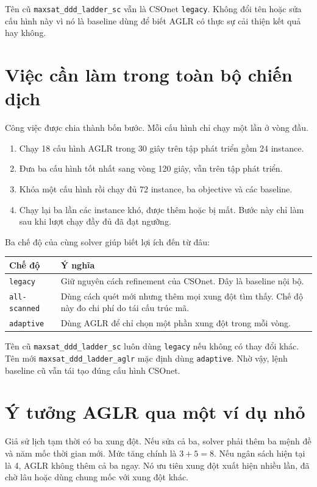 \documentclass[11pt,a4paper]{article}
\newcommand{\code}[1]{\texttt{#1}}
\newcommand{\file}[1]{\nolinkurl{#1}}
\begin{document}
Tên cũ \file{maxsat_ddd_ladder_sc} vẫn là CSOnet \code{legacy}. Không đổi tên
hoặc sửa cấu hình này vì nó là baseline dùng để biết AGLR có thực sự cải thiện
kết quả hay không.

\section{Việc cần làm trong toàn bộ chiến dịch}

Công việc được chia thành bốn bước. Mỗi cấu hình chỉ chạy một lần ở vòng đầu.

\begin{enumerate}
\item Chạy 18 cấu hình AGLR trong 30 giây trên tập phát triển gồm 24 instance.
\item Đưa ba cấu hình tốt nhất sang vòng 120 giây, vẫn trên tập phát triển.
\item Khóa một cấu hình rồi chạy đủ 72 instance, ba objective và các baseline.
\item Chạy lại ba lần các instance khó, được thêm hoặc bị mất. Bước này chỉ làm
      sau khi lượt chạy đầy đủ đã đạt ngưỡng.
\end{enumerate}

Ba chế độ của cùng solver giúp biết lợi ích đến từ đâu:

\begin{tabularx}{\textwidth}{@{}p{29mm}X@{}}
\toprule
Chế độ & Ý nghĩa \\
\midrule
\code{legacy} & Giữ nguyên cách refinement của CSOnet. Đây là baseline nội bộ. \\
\code{all-scanned} & Dùng cách quét mới nhưng thêm mọi xung đột tìm thấy. Chế độ
này đo chi phí do tái cấu trúc mã. \\
\code{adaptive} & Dùng AGLR để chỉ chọn một phần xung đột trong mỗi vòng. \\
\bottomrule
\end{tabularx}

Tên cũ \file{maxsat_ddd_ladder_sc} luôn dùng \code{legacy} nếu không có thay
đổi khác. Tên mới \file{maxsat_ddd_ladder_aglr} mặc định dùng
\code{adaptive}. Nhờ vậy, lệnh baseline cũ vẫn tái tạo đúng cấu hình CSOnet.

\section{Ý tưởng AGLR qua một ví dụ nhỏ}

Giả sử lịch tạm thời có ba xung đột. Nếu sửa cả ba, solver phải thêm ba mệnh đề
và năm mốc thời gian mới. Mức tăng chính là $3+5=8$. Nếu ngân sách hiện tại là
4, AGLR không thêm cả ba ngay. Nó ưu tiên xung đột xuất hiện nhiều lần, đã chờ
lâu hoặc dùng chung mốc với xung đột khác.
\end{document}
